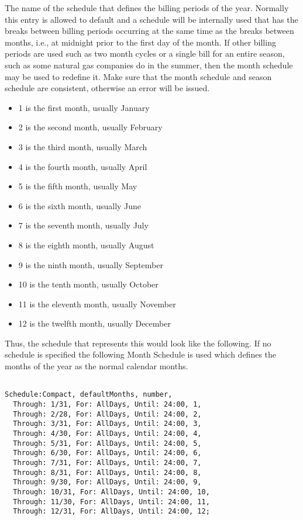 The name of the schedule that defines the billing periods of the year. Normally this entry is allowed to default and a schedule will be internally used that has the breaks between billing periods occurring at the same time as the breaks between months, i.e., at midnight prior to the first day of the month. If other billing periods are used such as two month cycles or a single bill for an entire season, such as some natural gas companies do in the summer, then the month schedule may be used to redefine it. Make sure that the month schedule and season schedule are consistent, otherwise an error will be issued.

\begin{itemize}
\item
  1 is the first month, usually January
\item
  2 is the second month, usually February
\item
  3 is the third month, usually March
\item
  4 is the fourth month, usually April
\item
  5 is the fifth month, usually May
\item
  6 is the sixth month, usually June
\item
  7 is the seventh month, usually July
\item
  8 is the eighth month, usually August
\item
  9 is the ninth month, usually September
\item
  10 is the tenth month, usually October
\item
  11 is the eleventh month, usually November
\item
  12 is the twelfth month, usually December
\end{itemize}

Thus, the schedule that represents this would look like the following. If no schedule is specified the following Month Schedule is used which defines the months of the year as the normal calendar months.

\begin{lstlisting}

Schedule:Compact, defaultMonths, number,
  Through: 1/31, For: AllDays, Until: 24:00, 1,
  Through: 2/28, For: AllDays, Until: 24:00, 2,
  Through: 3/31, For: AllDays, Until: 24:00, 3,
  Through: 4/30, For: AllDays, Until: 24:00, 4,
  Through: 5/31, For: AllDays, Until: 24:00, 5,
  Through: 6/30, For: AllDays, Until: 24:00, 6,
  Through: 7/31, For: AllDays, Until: 24:00, 7,
  Through: 8/31, For: AllDays, Until: 24:00, 8,
  Through: 9/30, For: AllDays, Until: 24:00, 9,
  Through: 10/31, For: AllDays, Until: 24:00, 10,
  Through: 11/30, For: AllDays, Until: 24:00, 11,
  Through: 12/31, For: AllDays, Until: 24:00, 12;
\end{lstlisting}

